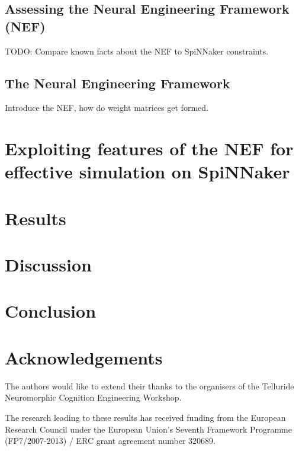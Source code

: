 \documentclass[conference]{IEEEtran}
\begin{document}
  \subsection{Assessing the Neural Engineering Framework (NEF)}

  TODO: Compare known facts about the NEF to SpiNNaker constraints.

  \subsection{The Neural Engineering Framework}

  Introduce the NEF, how do weight matrices get formed.

  \section{Exploiting features of the NEF for effective simulation on SpiNNaker}

  \section{Results}

  \section{Discussion}

  \section{Conclusion}

  \section*{Acknowledgements}

The authors would like to extend their thanks to the organisers of the Telluride Neuromorphic Cognition Engineering Workshop.

The research leading to these results has received funding from the European Research Council under the European Union’s Seventh Framework Programme (FP7/2007-2013) / ERC grant agreement number 320689.

  \printbibliography
\end{document}
